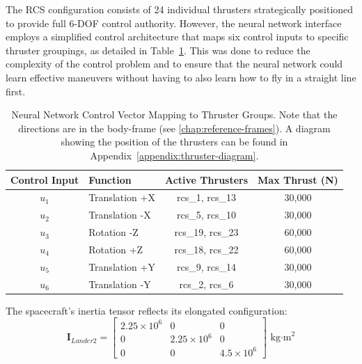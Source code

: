 The RCS configuration consists of 24 individual thrusters strategically
positioned to provide full 6-DOF control authority. However, the neural network
interface employs a simplified control architecture that maps six control
inputs to specific thruster groupings, as detailed in
Table~\ref{tab:control_mapping}. This was done to reduce the complexity of the
control problem and to ensure that the neural network could learn effective
maneuvers without having to also learn how to fly in a straight line first.
\begin{table}[htbp]
    \centering
    \caption{Neural Network Control Vector Mapping to Thruster Groups. Note that the directions are in the body-frame (see \autoref{chap:reference-frames}). A diagram showing the position of the thrusters can be found in Appendix~\ref{appendix:thruster-diagram}.}
    \label{tab:control_mapping}
    \begin{tabular}{clcc}
        \toprule
        \textbf{Control Input} & \textbf{Function} & \textbf{Active Thrusters} & \textbf{Max Thrust (N)} \\
        \midrule
        $u_1$                  & Translation +X    & rcs\_1, rcs\_13           & 30,000                  \\
        $u_2$                  & Translation -X    & rcs\_5, rcs\_10           & 30,000                  \\
        $u_3$                  & Rotation -Z       & rcs\_19, rcs\_23          & 60,000                  \\
        $u_4$                  & Rotation +Z       & rcs\_18, rcs\_22          & 60,000                  \\
        $u_5$                  & Translation +Y    & rcs\_9, rcs\_14           & 30,000                  \\
        $u_6$                  & Translation -Y    & rcs\_2, rcs\_6            & 30,000                  \\
        \bottomrule
    \end{tabular}
\end{table}

The spacecraft's inertia tensor reflects its elongated configuration:
\begin{equation}
    \mathbf{I}_{Lander2} = \begin{bmatrix}
        2.25 \times 10^6 & 0                & 0               \\
        0                & 2.25 \times 10^6 & 0               \\
        0                & 0                & 4.5 \times 10^6
    \end{bmatrix} \text{ kg·m}^2
\end{equation}

